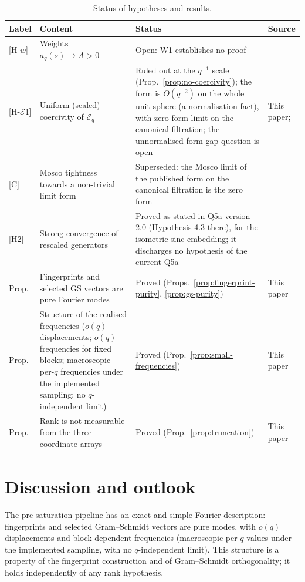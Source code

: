 \documentclass[11pt,a4paper]{article}
\theoremstyle{plain}
\theoremstyle{definition}
\newcommand{\Eq}{\mathcal{E}_q}
\begin{document}
  \begin{table}[h]
    \centering
    \small
    \renewcommand{\arraystretch}{1.3}
    \begin{tabularx}{\textwidth}{@{}lp{4.5cm}Xp{2.2cm}@{}}
\toprule
Label & Content & Status & Source \\
\midrule
{[H-$w$]} & Weights $a_q(s)\to A>0$
& Open: W1 establishes no proof & \cite{Beau2026w1} \\
{[H-$\mathcal{E}$1]} & Uniform (scaled) coercivity of $\Eq$
& Ruled out at the $q^{-1}$ scale (Prop.~\ref{prop:no-coercivity}); the form is
$O(q^{-2})$ on the whole unit sphere (a normalisation fact), with zero-form limit on the
canonical filtration; the unnormalised-form gap question is open
& This paper; \cite{Beau2026q5a} \\
{[C]} & Mosco tightness towards a non-trivial limit form
& Superseded: the Mosco limit of the published form on the canonical filtration is the
zero form
& \cite{Beau2026q5a} \\
{[H2]} & Strong convergence of rescaled generators
& Proved as stated in Q5a version 2.0 (Hypothesis 4.3 there), for the isometric sinc
embedding; it discharges no hypothesis of the current Q5a
& \cite{Beau2026h2} \\
\midrule
Prop. & Fingerprints and selected GS vectors are pure Fourier modes
& Proved (Props.~\ref{prop:fingerprint-purity}, \ref{prop:gs-purity})
& This paper \\
Prop. & Structure of the realised frequencies ($o(q)$ displacements; $o(q)$ frequencies
for fixed blocks; macroscopic per-$q$ frequencies under the implemented sampling; no
$q$-independent limit)
& Proved (Prop.~\ref{prop:small-frequencies})
& This paper \\
Prop. & Rank is not measurable from the three-coordinate arrays
& Proved (Prop.~\ref{prop:truncation})
& This paper \\
\bottomrule
    \end{tabularx}
    \caption{Status of hypotheses and results.}
    \label{tab:status}
  \end{table}

  \section{Discussion and outlook}
  \label{sec:discussion}

  The pre-saturation pipeline has an exact and simple Fourier description: fingerprints
  and selected Gram--Schmidt vectors are pure modes, with $o(q)$ displacements and
  block-dependent frequencies (macroscopic per-$q$ values under the implemented sampling,
  with no $q$-independent limit).
  This structure is a property of the fingerprint construction and of Gram--Schmidt
  orthogonality; it holds independently of any rank hypothesis.
\end{document}
